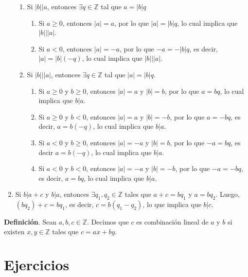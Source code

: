 \documentclass[11pt]{article}
\newcommand{\Z}{\mathbb{Z}}
\begin{document}
\begin{enumerate}[label=P\arabic*.]
\begin{enumerate}[label=\roman*)]
      \item Si $|b| \Big| a$, entonces $\exists q \in \Z$ tal que $a= |b|q$
        \begin{enumerate}[label=\alph*),font=\bfseries]
          \item Si $a \geq 0$, entonces $|a|=a$, por lo que $|a|=|b|q$, lo cual implica que $|b| \Big| |a|$.
          \item Si $a <0$, entonces $|a|=-a$, por lo que $-a=-|b|q$, es decir, $|a|=|b|(-q)$, lo cual implica que $|b| \Big| |a|$.
        \end{enumerate}
      \item Si $|b| \Big| |a|$, entonces $\exists q \in \Z$ tal que $|a|=|b|q$.
      \begin{enumerate}[label=\alph*),font=\bfseries]
        \item Si $a \geq 0$ y $b \geq 0$, entonces $|a|=a$ y $|b|=b$, por lo que $a=bq$, lo cual implica que $b|a$.
        \item Si $a \geq 0$ y $b < 0$, entonces $|a|=a$ y $|b|=-b$, por lo que $a=-bq$, es decir, $a=b(-q)$, lo cual implica que $b|a$.
        \item Si $a < 0$ y $b \geq 0$, entonces $|a|=-a$ y $|b|=b$, por lo que $-a=bq$, es decir $a=b(-q)$, lo cual implica que $b|a$.
        \item Si $a<0$ y $b<0$, entonces $|a|=-a$ y $|b|=-b$, por lo que $-a=-bq$, es decir, $a=bq$, lo cual implica que $b|a$.
      \end{enumerate}
      \end{enumerate}
      \item Si $b|a+c$ y $b|a$, entonces $\exists q_1,q_2 \in \Z$ tales que $a+c=bq_1$ y $a=bq_2$. Luego, $(bq_2)+c=bq_1$, es decir, $c=b(q_1-q_2)$, lo que implica que $b|c$.
    \end{enumerate}


\textbf{Definición}. Sean $a,b,c\in \Z$. Decimos que $c$ es combinación lineal de $a$ y $b$ si existen $x,y\in \Z$ tales que $c=ax+by$.


\section{Ejercicios}
\end{document}
